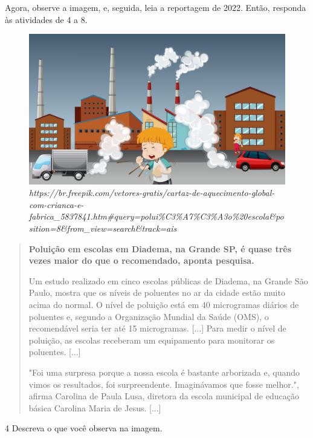 \begin{itemize}
\begin{itemize}


Agora, observe a imagem, e, seguida, leia a reportagem de 2022. Então, responda às atividades de 4 a 8.

\begin{figure}[htpb!]
\includegraphics[width=.5\textwidth]{./imgs/img34.png}
\caption{\emph{https://br.freepik.com/vetores-gratis/cartaz-de-aquecimento-global-com-crianca-e-fabrica\_5837841.htm\#query=polui\%C3\%A7\%C3\%A3o\%20escola\&position=8\&from\_view=search\&track=ais}}
\end{figure}

\begin{quote}
\textbf{Poluição em escolas em Diadema, na Grande SP, é quase três vezes maior
do que o recomendado, aponta pesquisa.}

Um estudo realizado em cinco escolas públicas de Diadema, na Grande São
Paulo, mostra que os níveis de poluentes no ar da cidade estão muito
acima do normal. O nível de poluição está em 40 microgramas diários de
poluentes e, segundo a Organização Mundial da Saúde (OMS), o
recomendável seria ter até 15 microgramas. [...] Para medir o nível de
poluição, as escolas receberam um equipamento para monitorar os
poluentes. [...]

"Foi uma surpresa porque a nossa escola é bastante arborizada e, quando
vimos os resultados, foi surpreendente. Imaginávamos que fosse melhor.",
afirma Carolina de Paula Lusa, diretora da escola municipal de educação
básica Carolina Maria de Jesus. [...]

\end{quote}

\num{4} Descreva o que você observa na imagem.


\end{itemize}
\end{itemize}
